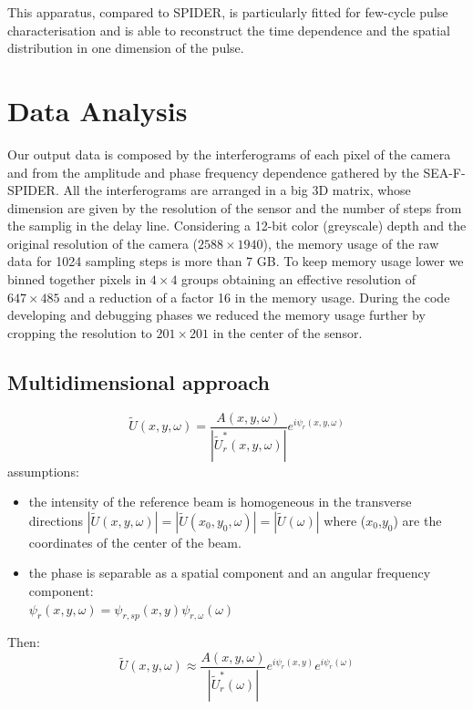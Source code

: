 \documentclass[12pt,a4paper,twoside]{article}
\begin{document}
This apparatus, compared to SPIDER, is particularly fitted for few-cycle pulse characterisation and is able to reconstruct the time dependence and the spatial distribution in one dimension of the pulse.

\section{Data Analysis}
Our output data is composed by the interferograms of each pixel of the camera and from the amplitude and phase frequency dependence gathered by the SEA-F-SPIDER.
All the interferograms are arranged in a big 3D matrix, whose dimension are given by the resolution of the sensor and the number of steps from the samplig in the delay line.
Considering a 12-bit color (greyscale) depth and the original resolution of the camera ($2588\times 1940$), the memory usage of the raw data for 1024 sampling steps is more than 7 GB.
To keep memory usage lower we binned together pixels in $4\times 4$ groups obtaining an effective resolution of $647\times 485$ and a reduction of a factor 16 in the memory usage.
During the code developing and debugging phases we reduced the memory usage further by cropping the resolution to $201\times 201$ in the center of the sensor.
\subsection{Multidimensional approach}
\begin{equation}
	\tilde{U}(x,y,\omega) = \frac{A(x,y,\omega)}{|\tilde{U}_r^*(x,y,\omega)|}e^{i\psi_r(x,y,\omega)}
\end{equation}
assumptions:
\begin{itemize}
\item the intensity of the reference beam is homogeneous in the transverse directions $|\tilde{U}(x,y,\omega)|=|\tilde{U}(x_0,y_0,\omega)|=|\tilde{U}(\omega)|$ where ($x_0$,$y_0$) are the coordinates of the center of the beam.
\item the phase is separable as a spatial component and an angular frequency component:\\ $\psi_r(x,y,\omega) = \psi_{r,sp}(x,y)\psi_{r,\omega}(\omega)$
\end{itemize}
Then:
\begin{equation}
	\tilde{U}(x,y,\omega) \approx \frac{A(x,y,\omega)}{|\tilde{U}_r^*(\omega)|}e^{i\psi_r(x,y)}e^{i\psi_r(\omega)}
\end{equation}
\end{document}
